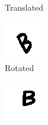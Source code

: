 \documentclass{article}
\begin{document}
\begin{figure}
\begin{subfigure}{0.15\textwidth}
  \caption{Translated}
\end{subfigure}
\begin{subfigure}{0.15\textwidth}
  \centering
  \includegraphics[width=\linewidth]{images/rotated}
  \caption{Rotated}
\end{subfigure}
\begin{subfigure}{0.15\textwidth}
  \centering
  \includegraphics[width=\linewidth]{images/scaled}

\end{subfigure}
\end{figure}
\end{document}
